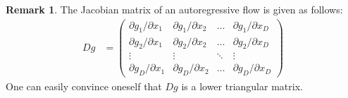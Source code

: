 \documentclass[12pt, a4paper]{article}
\numberwithin{equation}{section}
\theoremstyle{definition}
\theoremstyle{definition}
\newtheorem{remark}[thm]{Remark} %
\begin{document}
	\begin{remark}
		The Jacobian matrix of an autoregressive flow is given as follows: 
		\begin{align}
			Dg &= \begin{pmatrix}
				\partial g_1/\partial x_1 & \partial g_1/\partial x_2 & \dots & \partial g_1/\partial x_D 
								\\ 
				\partial g_2/\partial x_1 & \partial g_2/\partial x_2 & \dots & \partial g_2/\partial x_D
								\\
				\vdots & \vdots & \ddots & \vdots 
								\\ 
				\partial g_D/\partial x_1 & \partial g_D / \partial x_2 & \dots & \partial g_D / \partial x_D
			\end{pmatrix} 
		\end{align}
	One can easily convince oneself that $Dg$ is a lower triangular matrix. 
	\end{remark}
\end{document}
